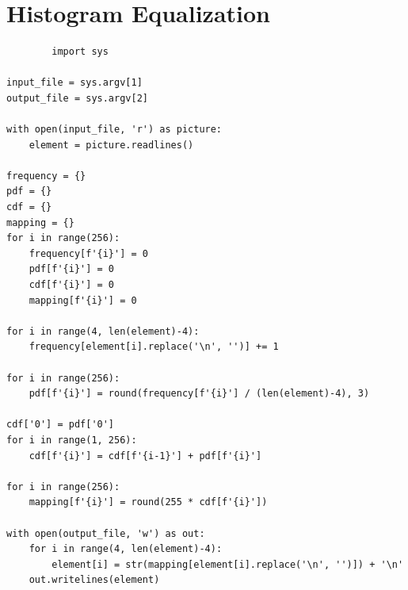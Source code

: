 \documentclass[a4paper,8pt]{article}
\begin{document}
        \section{Histogram Equalization}
        \begin{verbatim}
        import sys

input_file = sys.argv[1]
output_file = sys.argv[2]

with open(input_file, 'r') as picture:
    element = picture.readlines()

frequency = {}
pdf = {}
cdf = {}
mapping = {}
for i in range(256):
    frequency[f'{i}'] = 0
    pdf[f'{i}'] = 0
    cdf[f'{i}'] = 0
    mapping[f'{i}'] = 0
    
for i in range(4, len(element)-4):
    frequency[element[i].replace('\n', '')] += 1

for i in range(256):
    pdf[f'{i}'] = round(frequency[f'{i}'] / (len(element)-4), 3)

cdf['0'] = pdf['0']
for i in range(1, 256):
    cdf[f'{i}'] = cdf[f'{i-1}'] + pdf[f'{i}']

for i in range(256):
    mapping[f'{i}'] = round(255 * cdf[f'{i}'])

with open(output_file, 'w') as out:
    for i in range(4, len(element)-4):
        element[i] = str(mapping[element[i].replace('\n', '')]) + '\n'
    out.writelines(element)


        \end{verbatim}
        
\end{document}

